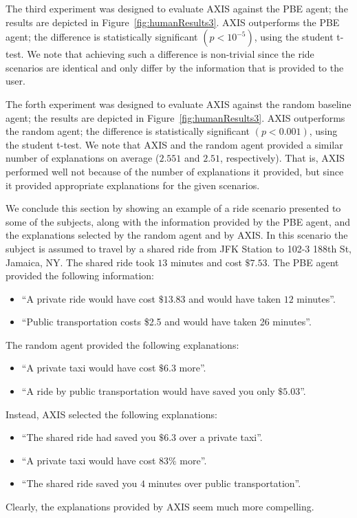 \documentclass[letterpaper]{article} %
\begin{document}
The third experiment was designed to evaluate AXIS against the PBE  agent; the results are depicted in Figure~\ref{fig:humanResults3}.
AXIS outperforms the PBE agent; the difference is statistically significant $(p<10^{-5})$, using the student t-test.
We note that achieving such a difference is non-trivial since the ride scenarios are identical and only differ by the information that is provided to the user.

The forth experiment was designed to evaluate AXIS against the random baseline agent; the results are depicted in Figure~\ref{fig:humanResults3}.
AXIS outperforms the random agent; the difference is statistically significant $(p<0.001)$, using the student t-test.
We note that AXIS and the random agent provided a similar number of explanations on average ($2.551$ and $2.51$, respectively). That is, AXIS performed well not because of the number of explanations it provided, but since it provided appropriate explanations for the given scenarios.
%

We conclude this section by showing an example of a ride scenario presented to some of the subjects, along with the information provided by the PBE agent, and the explanations selected by the random agent and by AXIS.
In this scenario the subject is assumed to travel by a shared ride from JFK Station to 102-3 188th St, Jamaica, NY.
The shared ride took $13$ minutes and cost $\$7.53$.
The PBE agent provided the following information:
\begin{itemize}
    \item ``A private ride would have cost $\$13.83$ and would have taken $12$ minutes''.
    \item ``Public transportation costs \$2.5 and would have taken 26 minutes''.
\end{itemize}
The random agent provided the following explanations:
\begin{itemize}
    \item ``A private taxi would have cost $\$6.3$ more''.
    \item ``A ride by public transportation would have saved you only $\$5.03$''.
\end{itemize}
Instead, AXIS selected the following explanations:
\begin{itemize}
    \item ``The shared ride had saved you $\$6.3$ over a private taxi''.
    \item ``A private taxi would have cost $83\%$ more''.
    \item ``The shared ride saved you $4$ minutes over public transportation''.
\end{itemize}
Clearly, the explanations provided by AXIS seem much more compelling.
\end{document}
